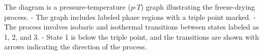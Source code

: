 The diagram is a pressure-temperature (\(p\)-\(T\)) graph illustrating the freeze-drying process.  
- The graph includes labeled phase regions with a triple point marked.  
- The process involves isobaric and isothermal transitions between states labeled as 1, 2, and 3.  
- State 1 is below the triple point, and the transitions are shown with arrows indicating the direction of the process.
